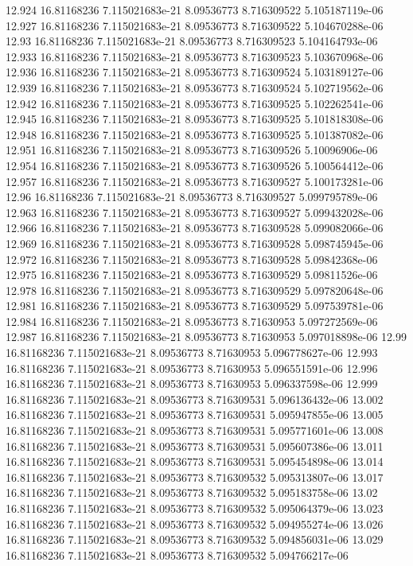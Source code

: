 {12.924 16.81168236 7.115021683e-21 8.09536773 8.716309522 5.105187119e-06
12.927 16.81168236 7.115021683e-21 8.09536773 8.716309522 5.104670288e-06
12.93 16.81168236 7.115021683e-21 8.09536773 8.716309523 5.104164793e-06
12.933 16.81168236 7.115021683e-21 8.09536773 8.716309523 5.103670968e-06
12.936 16.81168236 7.115021683e-21 8.09536773 8.716309524 5.103189127e-06
12.939 16.81168236 7.115021683e-21 8.09536773 8.716309524 5.102719562e-06
12.942 16.81168236 7.115021683e-21 8.09536773 8.716309525 5.102262541e-06
12.945 16.81168236 7.115021683e-21 8.09536773 8.716309525 5.101818308e-06
12.948 16.81168236 7.115021683e-21 8.09536773 8.716309525 5.101387082e-06
12.951 16.81168236 7.115021683e-21 8.09536773 8.716309526 5.10096906e-06
12.954 16.81168236 7.115021683e-21 8.09536773 8.716309526 5.100564412e-06
12.957 16.81168236 7.115021683e-21 8.09536773 8.716309527 5.100173281e-06
12.96 16.81168236 7.115021683e-21 8.09536773 8.716309527 5.099795789e-06
12.963 16.81168236 7.115021683e-21 8.09536773 8.716309527 5.099432028e-06
12.966 16.81168236 7.115021683e-21 8.09536773 8.716309528 5.099082066e-06
12.969 16.81168236 7.115021683e-21 8.09536773 8.716309528 5.098745945e-06
12.972 16.81168236 7.115021683e-21 8.09536773 8.716309528 5.09842368e-06
12.975 16.81168236 7.115021683e-21 8.09536773 8.716309529 5.09811526e-06
12.978 16.81168236 7.115021683e-21 8.09536773 8.716309529 5.097820648e-06
12.981 16.81168236 7.115021683e-21 8.09536773 8.716309529 5.097539781e-06
12.984 16.81168236 7.115021683e-21 8.09536773 8.71630953 5.097272569e-06
12.987 16.81168236 7.115021683e-21 8.09536773 8.71630953 5.097018898e-06
12.99 16.81168236 7.115021683e-21 8.09536773 8.71630953 5.096778627e-06
12.993 16.81168236 7.115021683e-21 8.09536773 8.71630953 5.096551591e-06
12.996 16.81168236 7.115021683e-21 8.09536773 8.71630953 5.096337598e-06
12.999 16.81168236 7.115021683e-21 8.09536773 8.716309531 5.096136432e-06
13.002 16.81168236 7.115021683e-21 8.09536773 8.716309531 5.095947855e-06
13.005 16.81168236 7.115021683e-21 8.09536773 8.716309531 5.095771601e-06
13.008 16.81168236 7.115021683e-21 8.09536773 8.716309531 5.095607386e-06
13.011 16.81168236 7.115021683e-21 8.09536773 8.716309531 5.095454898e-06
13.014 16.81168236 7.115021683e-21 8.09536773 8.716309532 5.095313807e-06
13.017 16.81168236 7.115021683e-21 8.09536773 8.716309532 5.095183758e-06
13.02 16.81168236 7.115021683e-21 8.09536773 8.716309532 5.095064379e-06
13.023 16.81168236 7.115021683e-21 8.09536773 8.716309532 5.094955274e-06
13.026 16.81168236 7.115021683e-21 8.09536773 8.716309532 5.094856031e-06
13.029 16.81168236 7.115021683e-21 8.09536773 8.716309532 5.094766217e-06
}

